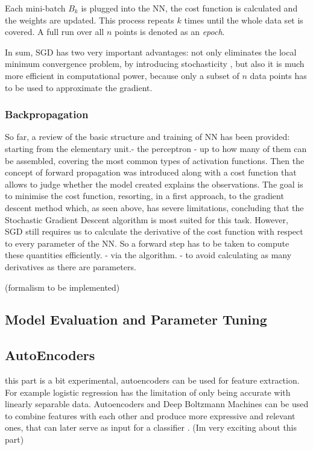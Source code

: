 Each mini-batch $B_k$ is plugged into the NN, the cost function is calculated and the weights are updated. This process repeats $k$ times until the whole data set is covered. A full run over all $n$ points is denoted as an \textit{epoch}. \cite{ml_phys}

In sum, SGD has two very important advantages: not only eliminates the local minimum convergence problem, by introducing stochasticity , but also it is much more efficient in computational power, because only a subset of $n$ data points has to be used to approximate the gradient.


\subsubsection{Backpropagation}

So far, a review of the basic structure and training of NN has been provided: starting from the elementary unit.- the perceptron - up to how many of them can be assembled, covering the most common types of activation functions. Then the concept of forward propagation was introduced along with a cost function that allows to judge whether the model created explains the observations. The goal is to minimise the cost function, resorting, in a first approach, to the gradient descent method which, as seen above, has severe limitations, concluding that the Stochastic Gradient Descent algorithm is most suited for this task. However, SGD still requires us to calculate the derivative of the cost function with respect to every parameter of the NN. So a forward step has to be taken to compute these quantities efficiently. - via the  algorithm. - to avoid calculating as many derivatives as there are parameters.

(formalism to be implemented)



\subsection{Model Evaluation and Parameter Tuning}


\subsection{AutoEncoders}

this part is a bit experimental, autoencoders can be used for feature extraction. For example logistic regression has the limitation of only being accurate with linearly separable data. Autoencoders and Deep Boltzmann Machines can be used to combine features with each other and produce more expressive and relevant ones, that can later serve as input for a classifier . (Im very exciting about this part)